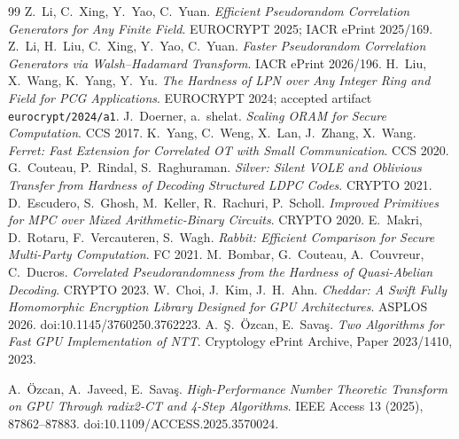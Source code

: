 \documentclass[11pt]{article}
\begin{document}
\begin{thebibliography}{99}
Z.~Li, C.~Xing, Y.~Yao, C.~Yuan.
\emph{Efficient Pseudorandom Correlation Generators for Any Finite Field}.
EUROCRYPT 2025; IACR ePrint 2025/169.
Z.~Li, H.~Liu, C.~Xing, Y.~Yao, C.~Yuan.
\emph{Faster Pseudorandom Correlation Generators via Walsh--Hadamard
Transform}.
IACR ePrint 2026/196.
H.~Liu, X.~Wang, K.~Yang, Y.~Yu.
\emph{The Hardness of LPN over Any Integer Ring and Field for PCG
Applications}.
EUROCRYPT 2024; accepted artifact \texttt{eurocrypt/2024/a1}.
J.~Doerner, a.~shelat. \emph{Scaling ORAM for Secure Computation}.
CCS 2017.
K.~Yang, C.~Weng, X.~Lan, J.~Zhang, X.~Wang.
\emph{Ferret: Fast Extension for Correlated OT with Small Communication}.
CCS 2020.
G.~Couteau, P.~Rindal, S.~Raghuraman.
\emph{Silver: Silent VOLE and Oblivious Transfer from Hardness of Decoding
Structured LDPC Codes}. CRYPTO 2021.
D.~Escudero, S.~Ghosh, M.~Keller, R.~Rachuri, P.~Scholl.
\emph{Improved Primitives for MPC over Mixed Arithmetic-Binary Circuits}.
CRYPTO 2020.
E.~Makri, D.~Rotaru, F.~Vercauteren, S.~Wagh.
\emph{Rabbit: Efficient Comparison for Secure Multi-Party Computation}.
FC 2021.
M.~Bombar, G.~Couteau, A.~Couvreur, C.~Ducros.
\emph{Correlated Pseudorandomness from the Hardness of Quasi-Abelian
Decoding}. CRYPTO 2023.
W.~Choi, J.~Kim, J.~H.~Ahn.
\emph{Cheddar: A Swift Fully Homomorphic Encryption Library Designed for GPU
Architectures}.
ASPLOS 2026. doi:10.1145/3760250.3762223.
A.~\c{S}.~\"Ozcan, E.~Sava\c{s}.
\emph{Two Algorithms for Fast GPU Implementation of NTT}.
Cryptology ePrint Archive, Paper 2023/1410, 2023.
{\raggedright
A.~\"Ozcan, A.~Javeed, E.~Sava\c{s}.
\emph{High-Performance Number Theoretic Transform on GPU Through radix2-CT
and 4-Step Algorithms}.
IEEE Access 13 (2025), 87862--87883.
doi:10.1109/ACCESS.2025.3570024.\par}
\end{thebibliography}
\end{document}
